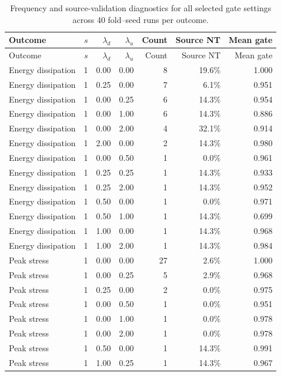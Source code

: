 \begin{longtable}{p{35mm}rrrrrr}
\caption{Frequency and source-validation diagnostics for all selected gate settings across 40 fold--seed runs per outcome.}\label{tab:s3_gate}\\
\toprule
Outcome & $s$ & $\lambda_d$ & $\lambda_u$ & Count & Source NT & Mean gate \\
\midrule
\endfirsthead
\toprule
Outcome & $s$ & $\lambda_d$ & $\lambda_u$ & Count & Source NT & Mean gate \\
\midrule
\endhead
Energy dissipation & 1 & 0.00 & 0.00 & 8 & 19.6\% & 1.000 \\
Energy dissipation & 1 & 0.25 & 0.00 & 7 & 6.1\% & 0.951 \\
Energy dissipation & 1 & 0.00 & 0.25 & 6 & 14.3\% & 0.954 \\
Energy dissipation & 1 & 0.00 & 1.00 & 6 & 14.3\% & 0.886 \\
Energy dissipation & 1 & 0.00 & 2.00 & 4 & 32.1\% & 0.914 \\
Energy dissipation & 1 & 2.00 & 0.00 & 2 & 14.3\% & 0.980 \\
Energy dissipation & 1 & 0.00 & 0.50 & 1 & 0.0\% & 0.961 \\
Energy dissipation & 1 & 0.25 & 0.25 & 1 & 14.3\% & 0.933 \\
Energy dissipation & 1 & 0.25 & 2.00 & 1 & 14.3\% & 0.952 \\
Energy dissipation & 1 & 0.50 & 0.00 & 1 & 0.0\% & 0.971 \\
Energy dissipation & 1 & 0.50 & 1.00 & 1 & 14.3\% & 0.699 \\
Energy dissipation & 1 & 1.00 & 0.00 & 1 & 14.3\% & 0.968 \\
Energy dissipation & 1 & 1.00 & 2.00 & 1 & 14.3\% & 0.984 \\
Peak stress & 1 & 0.00 & 0.00 & 27 & 2.6\% & 1.000 \\
Peak stress & 1 & 0.00 & 0.25 & 5 & 2.9\% & 0.968 \\
Peak stress & 1 & 0.25 & 0.00 & 2 & 0.0\% & 0.975 \\
Peak stress & 1 & 0.00 & 0.50 & 1 & 0.0\% & 0.951 \\
Peak stress & 1 & 0.00 & 1.00 & 1 & 0.0\% & 0.978 \\
Peak stress & 1 & 0.00 & 2.00 & 1 & 0.0\% & 0.978 \\
Peak stress & 1 & 0.50 & 0.00 & 1 & 14.3\% & 0.991 \\
Peak stress & 1 & 1.00 & 0.25 & 1 & 14.3\% & 0.967 \\

\end{longtable}
